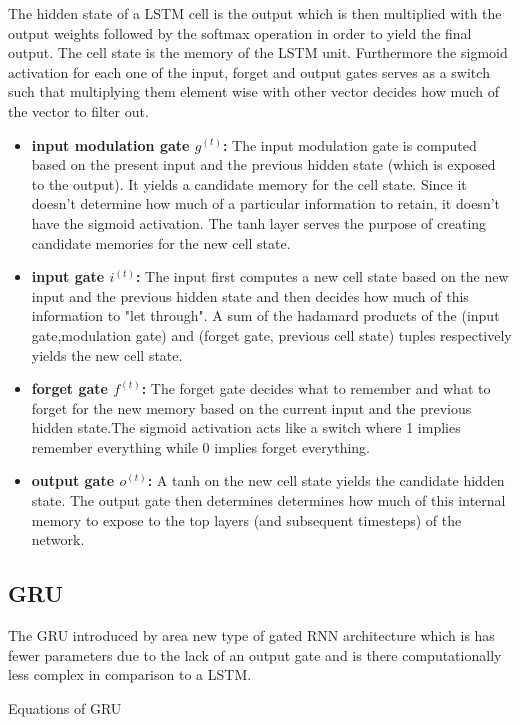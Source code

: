 The hidden state of a LSTM cell is the output which is then multiplied with the output weights followed by the softmax operation in order to yield the final output. The cell state is the memory of the LSTM unit. Furthermore the sigmoid activation for each one of the input, forget and output gates serves as a switch such that multiplying them element wise with other vector decides how much of the vector to filter out.
\begin{itemize}
	\item \textbf{input modulation gate $g^{(t)}$:} The input modulation gate is computed based on the present input and the previous hidden state (which is exposed to the output). It yields a candidate memory for the cell state. Since it doesn't determine how much of a particular information to retain, it doesn't have the sigmoid activation. The tanh layer serves the purpose of creating candidate memories for the new cell state.
	\item \textbf{input gate $i^{(t)}$:} The input first computes a new cell state based on the new input and the previous hidden state and then decides how much of this information to "let through". A sum of the hadamard products of the (input gate,modulation gate) and (forget gate, previous cell state) tuples respectively yields the new cell state.
	\item \textbf{forget gate $f^{(t)}$:} The forget gate decides what to remember and what to forget for the new memory based on the current input and the previous hidden state.The sigmoid activation acts like a switch where 1 implies remember everything while 0 implies forget everything.
	\item \textbf{output gate $o^{(t)}$:} A tanh on the new cell state yields the candidate hidden state. The output gate then determines determines how much of this internal memory to expose to the top layers (and subsequent timesteps) of the network.
\end{itemize}

\subsection{GRU}
The GRU introduced by \cite{GRU} area new type of gated RNN architecture which is has fewer parameters due to the lack of an output gate and is there computationally less complex in comparison to a LSTM.

Equations of GRU

